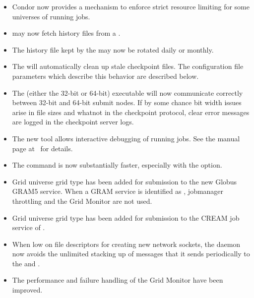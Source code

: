 \begin{itemize}

\item Condor now provides a mechanism to enforce strict resource limiting for
some universes of running jobs.

\item {} may now fetch history files from a .

\item The history file kept by the  may now be rotated daily or
monthly.

\item The  will automatically clean up stale
checkpoint files. The configuration file parameters which describe this
behavior are described below.

\item The  (either the 32-bit or 64-bit) executable
will now communicate correctly between 32-bit and 64-bit submit nodes.
If by some chance bit width issues arise in file sizes and whatnot in the
checkpoint protocol, clear error messages are logged in the checkpoint
server logs.

\item The new  tool allows interactive debugging of running
jobs.  See the manual page at~\pageref{man-condor-ssh-to-job} for details.

\item The  command is now substantially faster, 
especially with the  option.

\item Grid universe grid type  has been added for submission to
the new Globus GRAM5 service. When a GRAM service is identified as
, jobmanager throttling and the Grid Monitor are not used.

\item Grid universe grid type  has been added for submission
to the CREAM job service of .

\item When low on file descriptors for creating new network sockets,
the  daemon now avoids the unlimited stacking up of
messages that it sends periodically to the  
and .

\item The performance and failure handling of the Grid Monitor have been
improved.


\end{itemize}
